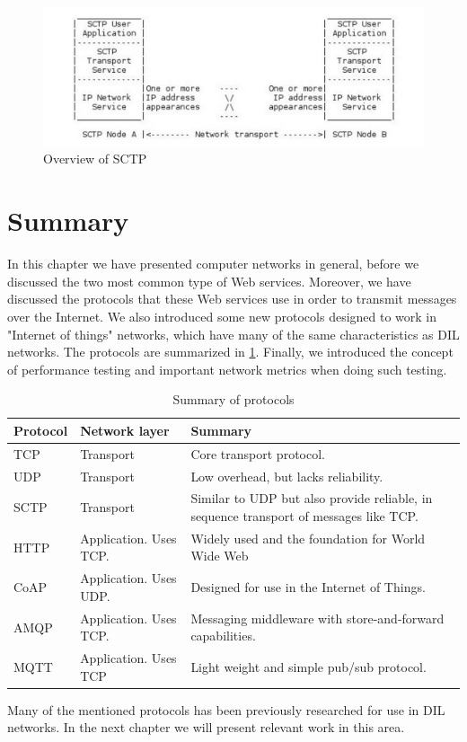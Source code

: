 \begin{figure}[h]
\includegraphics[scale=0.5]{images/sctp.pdf}
\caption{Overview of SCTP}
\end{figure}



\section{Summary}

In this chapter we have presented computer networks in general, before we
discussed the two most common type of Web services. Moreover, we have discussed
the protocols that these Web services use in order to transmit messages over the
Internet. We also introduced some new protocols designed to work in "Internet of
things" networks, which have many of the same characteristics as DIL networks.
The protocols are summarized in \cref{table:protocols:summary}. Finally, we
introduced the concept of performance testing and important network metrics when
doing such testing.

\begin{table}[h]
\begin{tabularx}{\textwidth}{| l | l | X |}
\hline
  \textbf{Protocol} & \textbf{Network layer} & \textbf{Summary} \\ \hline
  TCP & Transport & Core transport protocol. \\ \hline
  UDP & Transport & Low overhead, but lacks reliability. \\ \hline
  SCTP & Transport & Similar to UDP but also provide reliable, in sequence transport of messages like TCP. \\ \hline
  HTTP & Application. Uses TCP. &  Widely used and the foundation for World Wide Web\\ \hline
  CoAP & Application. Uses UDP. & Designed for use in the Internet of Things. \\ \hline
  AMQP & Application. Uses TCP. &  Messaging middleware with store-and-forward capabilities.\\ \hline
  MQTT & Application. Uses TCP & Light weight and simple pub/sub protocol. \\ \hline
\end{tabularx}
\caption{Summary of protocols}
\label{table:protocols:summary}
\end{table}

Many of the mentioned protocols has been previously researched for use in DIL
networks. In the next chapter we will present relevant work in this area.
